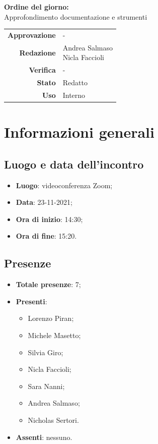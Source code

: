 \documentclass[11pt]{article}
\begin{document}
\begin{titlepage}
\begin{center}
			\large
			
			\vfill
			\textbf{Ordine del giorno:} \\
			Approfondimento documentazione e strumenti
			
			
			\vfill
			
			
			\begin{tabular}{r|l}
				\textbf{Approvazione} & - \\
				\textbf{Redazione} &  \parbox[t]{3.5cm}{Andrea Salmaso\\ Nicla Faccioli}\\
				\textbf{Verifica} & - \\
				\textbf{Stato} & Redatto \\
				\textbf{Uso} & Interno
			\end{tabular}
			\vfill
			
		\end{center}
	\end{titlepage}

	\section{Informazioni generali}
	\subsection{Luogo e data dell'incontro}
	\begin{itemize}
		\item \textbf{Luogo}: videoconferenza Zoom;
		\item \textbf{Data}: 23-11-2021;
		\item \textbf{Ora di inizio}: 14:30;
		\item \textbf{Ora di fine}: 15:20.
	\end{itemize}
	
	\subsection{Presenze}
	\begin{itemize}
		\item \textbf{Totale presenze}: 7;
		\item \textbf{Presenti}:
		\begin{itemize}
			\item Lorenzo Piran; 
			\item Michele Masetto;
			\item Silvia Giro;
			\item Nicla Faccioli;
			\item Sara Nanni;
			\item Andrea Salmaso;
			\item Nicholas Sertori.
		\end{itemize}
		\item \textbf{Assenti}: nessuno.
	\end{itemize}
\end{document}

